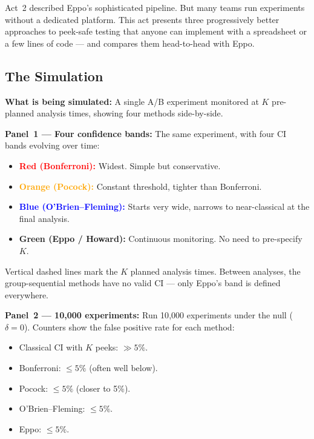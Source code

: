 \documentclass[12pt, a4paper]{article}
\begin{document}
Act~2 described Eppo's sophisticated pipeline.  But many teams run experiments
without a dedicated platform.  This act presents three progressively better
approaches to peek-safe testing that anyone can implement with a spreadsheet
or a few lines of code --- and compares them head-to-head with Eppo.

\subsection{The Simulation}

\begin{simulation}
\textbf{What is being simulated:}
A single A/B experiment monitored at $K$ pre-planned analysis times, showing
four methods side-by-side.

\textbf{Panel~1 --- Four confidence bands:}
The same experiment, with four CI bands evolving over time:
\begin{itemize}[nosep]
  \item \textcolor{red}{\textbf{Red (Bonferroni):}} Widest.  Simple but
        conservative.
  \item \textcolor{orange}{\textbf{Orange (Pocock):}} Constant threshold,
        tighter than Bonferroni.
  \item \textcolor{blue}{\textbf{Blue (O'Brien--Fleming):}} Starts very wide,
        narrows to near-classical at the final analysis.
  \item \textcolor{green!60!black}{\textbf{Green (Eppo / Howard):}}
        Continuous monitoring.  No need to pre-specify $K$.
\end{itemize}

Vertical dashed lines mark the $K$ planned analysis times.  Between analyses,
the group-sequential methods have no valid CI --- only Eppo's band is defined
everywhere.

\textbf{Panel~2 --- 10{,}000 experiments:}
Run 10{,}000 experiments under the null ($\delta = 0$).  Counters show the
false positive rate for each method:
\begin{itemize}[nosep]
  \item Classical CI with $K$ peeks: $\gg 5\%$.
  \item Bonferroni: $\leq 5\%$ (often well below).
  \item Pocock: $\leq 5\%$ (closer to 5\%).
  \item O'Brien--Fleming: $\leq 5\%$.
  \item Eppo: $\leq 5\%$.
\end{itemize}


\end{simulation}
\end{document}
